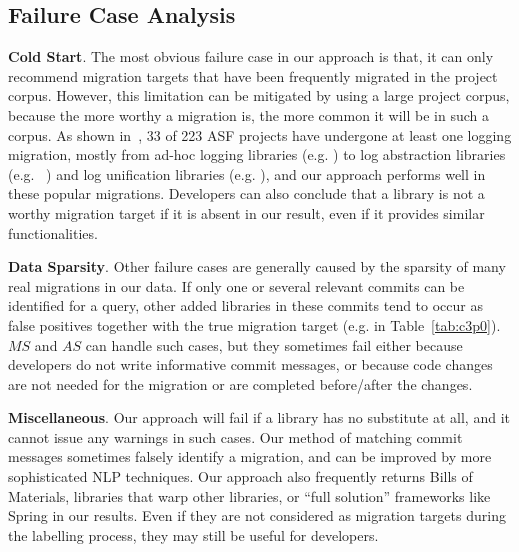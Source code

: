 \documentclass[conference, 10pt]{IEEEtran}
\begin{document}
\subsection{Failure Case Analysis}

\textbf{Cold Start}. 
The most obvious failure case in our approach is that, it can only recommend migration targets that have been frequently migrated in the project corpus. 
However, this limitation can be mitigated by using a large project corpus, because the more worthy a migration is, the more common it will be in such a corpus. 
As shown in~\cite{2016MSR-Kabinna-Logging}, 33 of 223 ASF projects have undergone at least one logging migration, mostly from ad-hoc logging libraries (e.g. ) to log abstraction libraries (e.g. \
) and log unification libraries (e.g. ), and our approach performs well in these popular migrations. 
Developers can also conclude that a library is not a worthy migration target if it is absent in our result, even if it provides similar functionalities.

\textbf{Data Sparsity}. 
Other failure cases are generally caused by the sparsity of many real migrations in our data. 
If only one or several relevant commits can be identified for a query, other added libraries in these commits tend to occur as false positives together with the true migration target (e.g.  in Table~\ref{tab:c3p0}).
$MS$ and $AS$ can handle such cases, but they sometimes fail either because developers do not write informative commit messages, or because code changes are not needed for the migration or are completed before/after the \Code{pom.xml} changes. 

\textbf{Miscellaneous}.
Our approach will fail if a library has no substitute at all, and it cannot issue any warnings in such cases.
Our method of matching commit messages sometimes falsely identify a migration, and can be improved by more sophisticated NLP techniques.
Our approach also frequently returns Bills of Materials, libraries that warp other libraries, or ``full solution'' frameworks like Spring in our results.
Even if they are not considered as migration targets during the labelling process, they may still be useful for developers.
\end{document}
